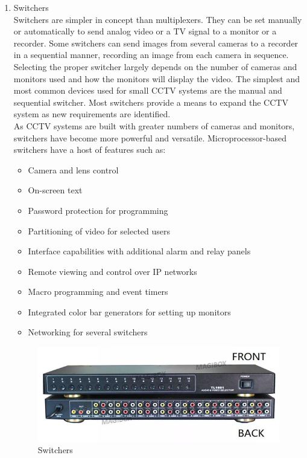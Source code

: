 \documentclass[12pt,fleqn]{book} %
\begin{document}
\begin{enumerate}
    \item Switchers
    \\Switchers are simpler in concept than multiplexers. They can be set manually or automatically to send analog video or a TV signal to a monitor or a recorder. Some switchers can send images from several cameras to a recorder in a sequential manner, recording an image from each camera in sequence. Selecting the proper switcher largely depends on the number of cameras and monitors used and how the monitors will display the video. The simplest and most common devices used for small CCTV systems are the manual and sequential switcher. Most switchers provide a means to expand the CCTV system as new requirements are identified. 
\\As CCTV systems are built with greater numbers of cameras and monitors, switchers have become more powerful and versatile. Microprocessor-based switchers have a host of features such as: 
\begin{itemize}
    \item Camera and lens control
    \item  On-screen text
    \item Password protection for programming
    \item Partitioning of video for selected users
    \item Interface capabilities with additional alarm and relay panels
    \item Remote viewing and control over IP networks
    \item Macro programming and event timers
    \item Integrated color bar generators for setting up monitors
    \item Networking for several switchers
 
\end{itemize}
                      \begin{figure}[!h]
    \centering
    \includegraphics[width=0.5\linewidth]{c 13.png}
    \caption{Switchers}
    \label{fig:c 13}
    \end{figure}


\end{enumerate}
\end{document}
